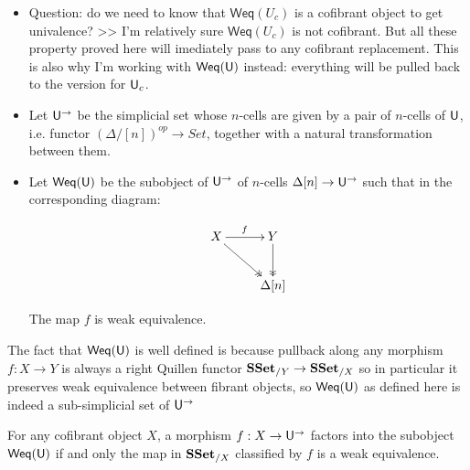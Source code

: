 \documentclass[reqno,10pt,a4paper,oneside,draft]{amsart}
\begin{document}
\begin{itemize}
\item Question: do we need to know that $\mathsf{Weq}(U_c)$ is a cofibrant object to get univalence? >> I'm relatively sure $\mathsf{Weq}(U_c)$ is not cofibrant. But all these property proved here will imediately pass to any cofibrant replacement. This is also why I'm working with  $\mathsf{Weq}(\mathsf{U})$ instead: everything will be pulled back to the version for $\mathsf{U}_c$.
\end{itemize}


\begin{definition}
\leavevmode
\begin{itemize}

\item Let $\mathsf{U}^{\rightarrow}$ be the simplicial set whose $n$-cells are given by a pair of $n$-cells of $\mathsf{U}$, i.e. functor $(\Delta/[n])^{op} \rightarrow Set$, together with a natural transformation between them.


\item Let $\mathsf{Weq}(\mathsf{U})$ be the subobject of $\mathsf{U}^{\rightarrow}$ of $n$-cells $\Delta[n] \rightarrow \mathsf{U}^{\rightarrow}$ such that in the corresponding diagram:
 

\[\xymatrix{ X \ar[r]^{f} \ar@{->>}[dr] & Y \ar@{->>}[d] \\
& \Delta[n]
}\]

The map $f$ is weak equivalence.

\end{itemize}

\end{definition}


The fact that $\mathsf{Weq}(\mathsf{U})$ is well defined is because pullback along any morphism $f:X \rightarrow Y$ is always a right Quillen functor $\mathbf{SSet}_{/Y} \rightarrow \mathbf{SSet}_{/X}$ so in particular it preserves weak equivalence between fibrant objects, so $\mathsf{Weq}(\mathsf{U})$ as defined here is indeed a sub-simplicial set of $\mathsf{U}^{\rightarrow}$

\begin{proposition}
\label{prop:Weq_classify_Weq}
For any cofibrant object $X$, a morphism $f:X \rightarrow \mathsf{U}^{\rightarrow}$ factors into the subobject $\mathsf{Weq}(\mathsf{U})$ if and only the map in $\mathbf{SSet}_{/X}$ classified by $f$ is a weak equivalence.

\end{proposition}
\end{document}
